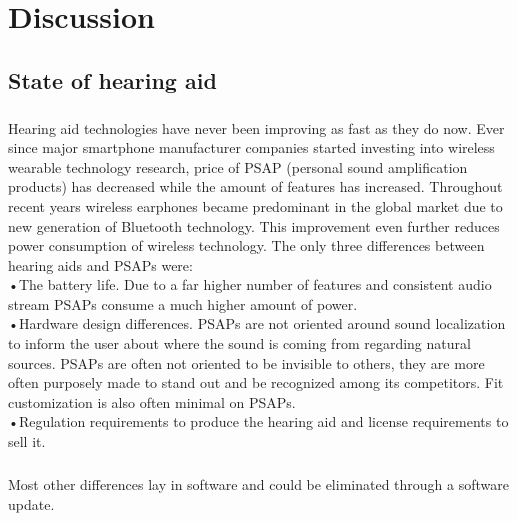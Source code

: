 \chapter{Discussion}\label{ch:discussion}
\section{State of hearing aid}
\paragraph{}
Hearing aid technologies have never been improving as fast as they do now. Ever since major smartphone manufacturer companies started investing into wireless wearable technology research, price of PSAP (personal sound amplification products) has decreased while the amount of features has increased. Throughout recent years wireless earphones became predominant in the global market due to new generation of Bluetooth technology. This improvement even further reduces power consumption of wireless technology. The only three differences between hearing aids and PSAPs were: \\

•The battery life. Due to a far higher number of features and consistent audio stream PSAPs consume a much higher amount of power.\\

•Hardware design differences. PSAPs are not oriented around sound localization to inform the user about where the sound is coming from regarding natural sources. PSAPs are often not oriented to be invisible to others, they are more often purposely made to stand out and be recognized among its competitors. Fit customization is also often minimal on PSAPs.\\

•Regulation requirements to produce the hearing aid and license requirements to sell it.

\paragraph{} 
Most other differences lay in software and could be eliminated through a software update.
